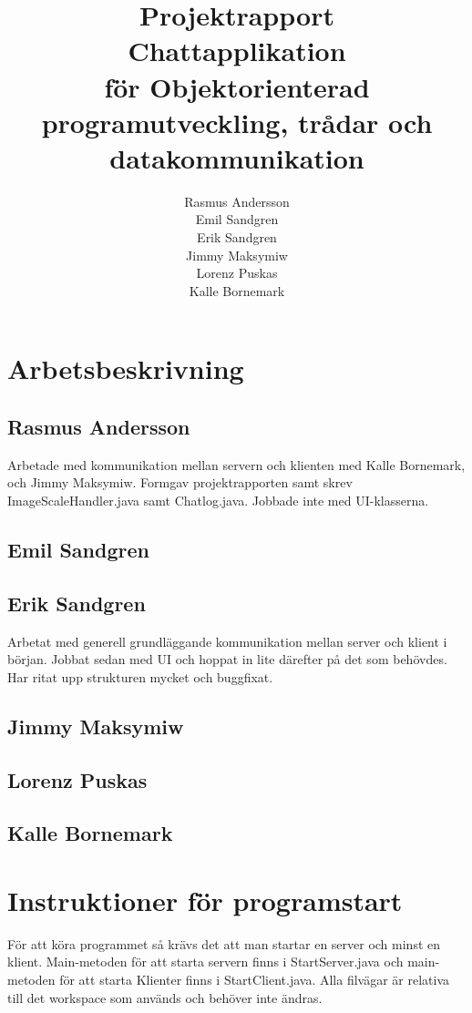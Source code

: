 \documentclass[a4paper,11pt]{article}
\title{Projektrapport\\
\large{Chattapplikation}\\
\large{för Objektorienterad programutveckling, trådar och datakommunikation} }
\author{Rasmus Andersson\\Emil Sandgren\\Erik Sandgren\\Jimmy Maksymiw\\Lorenz Puskas\\Kalle Bornemark}
\begin{document}
\pagestyle{fancy}
\maketitle
\newpage
\tableofcontents
\newpage

\section{Arbetsbeskrivning}

\subsection{Rasmus Andersson} 
Arbetade med kommunikation mellan servern och klienten med Kalle Bornemark, och Jimmy Maksymiw. Formgav projektrapporten samt skrev ImageScaleHandler.java samt Chatlog.java. Jobbade inte med UI-klasserna.

\subsection{Emil Sandgren} 
\subsection{Erik Sandgren} 

Arbetat med generell grundläggande kommunikation mellan server och klient i början. Jobbat sedan med UI och hoppat in lite därefter på det som behövdes. Har ritat upp strukturen mycket och buggfixat.

\subsection{Jimmy Maksymiw} 
\subsection{Lorenz Puskas} 
\subsection{Kalle Bornemark} 

\section{Instruktioner för programstart}
För att köra programmet så krävs det att man startar en server och minst en klient. Main-metoden för att starta servern finns i StartServer.java och main-metoden för att starta Klienter finns i StartClient.java. Alla filvägar är relativa till det workspace som används och behöver inte ändras.
\end{document}
